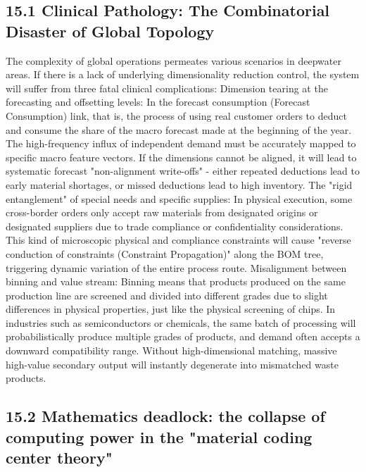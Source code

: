 \documentclass[11pt,a4paper]{article}
\begin{document}
\subsection*{15.1 Clinical Pathology: The Combinatorial Disaster of Global Topology}


The complexity of global operations permeates various scenarios in deepwater areas. If there is a lack of underlying dimensionality reduction control, the system will suffer from three fatal clinical complications: Dimension tearing at the forecasting and offsetting levels: In the forecast consumption (Forecast Consumption) link, that is, the process of using real customer orders to deduct and consume the share of the macro forecast made at the beginning of the year. The high-frequency influx of independent demand must be accurately mapped to specific macro feature vectors. If the dimensions cannot be aligned, it will lead to systematic forecast "non-alignment write-offs" - either repeated deductions lead to early material shortages, or missed deductions lead to high inventory. The "rigid entanglement" of special needs and specific supplies: In physical execution, some cross-border orders only accept raw materials from designated origins or designated suppliers due to trade compliance or confidentiality considerations. This kind of microscopic physical and compliance constraints will cause "reverse conduction of constraints (Constraint Propagation)" along the BOM tree, triggering dynamic variation of the entire process route. Misalignment between binning and value stream: Binning means that products produced on the same production line are screened and divided into different grades due to slight differences in physical properties, just like the physical screening of chips. In industries such as semiconductors or chemicals, the same batch of processing will probabilistically produce multiple grades of products, and demand often accepts a downward compatibility range. Without high-dimensional matching, massive high-value secondary output will instantly degenerate into mismatched waste products.


\subsection*{15.2 Mathematics deadlock: the collapse of computing power in the "material coding center theory"}
\end{document}
